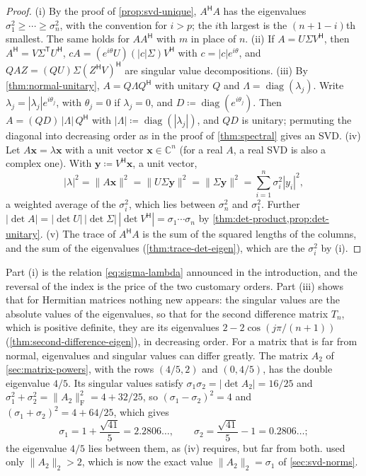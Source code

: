\begin{proof}
(i) By the proof of \cref{prop:svd-unique}, $A^{\mathsf H}A$ has the eigenvalues $\sigma_1^2\ge\cdots\ge\sigma_n^2$, with the convention for $i>p$; the $i$th largest is the $(n+1-i)$th smallest. The same holds for $AA^{\mathsf H}$ with $m$ in place of $n$. (ii) If $A=U\Sigma V^{\mathsf H}$, then $A^{\mathsf H}=V\Sigma^{\mathsf T}U^{\mathsf H}$, $cA=(e^{i\theta}U)(|c|\Sigma)V^{\mathsf H}$ with $c=|c|e^{i\theta}$, and $QAZ=(QU)\Sigma(Z^{\mathsf H}V)^{\mathsf H}$ are singular value decompositions. (iii) By \cref{thm:normal-unitary}, $A=Q\Lambda Q^{\mathsf H}$ with unitary $Q$ and $\Lambda=\operatorname{diag}(\lambda_j)$. Write $\lambda_j=|\lambda_j|e^{i\theta_j}$, with $\theta_j=0$ if $\lambda_j=0$, and $D\coloneqq\operatorname{diag}(e^{i\theta_j})$. Then $A=(QD)\,|\Lambda|\,Q^{\mathsf H}$ with $|\Lambda|\coloneqq\operatorname{diag}(|\lambda_j|)$, and $QD$ is unitary; permuting the diagonal into decreasing order as in the proof of \cref{thm:spectral} gives an SVD. (iv) Let $A\mathbf x=\lambda\mathbf x$ with a unit vector $\mathbf x\in\mathbb C^n$ (for a real $A$, a real SVD is also a complex one). With $\mathbf y\coloneqq V^{\mathsf H}\mathbf x$, a unit vector,
\[
|\lambda|^2=\|A\mathbf x\|^2=\|U\Sigma\mathbf y\|^2=\|\Sigma\mathbf y\|^2=\sum_{i=1}^n\sigma_i^2|y_i|^2 ,
\]
a weighted average of the $\sigma_i^2$, which lies between $\sigma_n^2$ and $\sigma_1^2$. Further $|\det A|=|\det U|\,|\det\Sigma|\,|\det V^{\mathsf H}|=\sigma_1\cdots\sigma_n$ by \cref{thm:det-product,prop:det-unitary}. (v) The trace of $A^{\mathsf H}A$ is the sum of the squared lengths of the columns, and the sum of the eigenvalues (\cref{thm:trace-det-eigen}), which are the $\sigma_i^2$ by (i).
\end{proof}

Part (i) is the relation \eqref{eq:sigma-lambda} announced in the introduction, and the reversal of the index is the price of the two customary orders. Part (iii) shows that for Hermitian matrices nothing new appears: the singular values are the absolute values of the eigenvalues, so that for the second difference matrix $T_n$, which is positive definite, they are its eigenvalues $2-2\cos(j\pi/(n+1))$ (\cref{thm:second-difference-eigen}), in decreasing order. For a matrix that is far from normal, eigenvalues and singular values can differ greatly. The matrix $A_2$ of \cref{sec:matrix-powers}, with the rows $(4/5,2)$ and $(0,4/5)$, has the double eigenvalue $4/5$. Its singular values satisfy $\sigma_1\sigma_2=|\det A_2|=16/25$ and $\sigma_1^2+\sigma_2^2=\|A_2\|_{\mathrm F}^2=4+32/25$, so $(\sigma_1-\sigma_2)^2=4$ and $(\sigma_1+\sigma_2)^2=4+64/25$, which gives
\[
\sigma_1=1+\frac{\sqrt{41}}5=2.2806\ldots,\qquad\sigma_2=\frac{\sqrt{41}}5-1=0.2806\ldots;
\]
the eigenvalue $4/5$ lies between them, as (iv) requires, but far from both.  used only $\|A_2\|_2>2$, which is now the exact value $\|A_2\|_2=\sigma_1$ of \cref{sec:svd-norms}.

